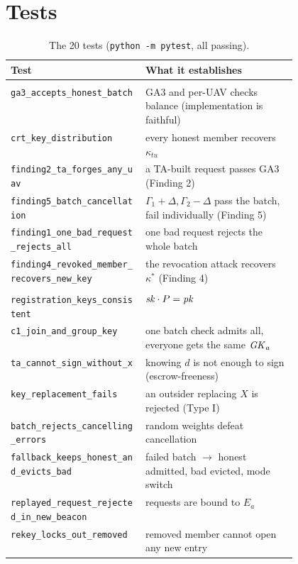 \section{Tests}
\begin{table}[H]
\centering\small
\caption{The 20 tests (\texttt{python -m pytest}, all passing).}
\label{tab:tests}
\begin{tabularx}{\linewidth}{@{}>{\raggedright\arraybackslash}p{0.47\linewidth}>{\raggedright\arraybackslash}X@{}}
\toprule
Test & What it establishes\\
\midrule
\multicolumn{2}{@{}l}{\emph{Base scheme}}\\
\texttt{ga3\_accepts\_honest\_batch} & GA3 and per-UAV checks balance (implementation is faithful)\\
\texttt{crt\_key\_distribution} & every honest member recovers $\kappa_{tu}$\\
\texttt{finding2\_ta\_forges\_any\_uav} & a TA-built request passes GA3 (Finding 2)\\
\texttt{finding5\_batch\_cancellation} & $\Gamma_1+\Delta,\Gamma_2-\Delta$ pass the batch, fail individually (Finding 5)\\
\texttt{finding1\_one\_bad\_request\_rejects\_all} & one bad request rejects the whole batch\\
\texttt{finding4\_revoked\_member\_recovers\_new\_key} & the revocation attack recovers $\kappa^*$ (Finding 4)\\
\midrule
\multicolumn{2}{@{}l}{\emph{Our framework}}\\
\texttt{registration\_keys\_consistent} & $\mathit{sk}\cdot P=\mathit{pk}$\\
\texttt{c1\_join\_and\_group\_key} & one batch check admits all, everyone gets the same $\mathit{GK}_a$\\
\texttt{ta\_cannot\_sign\_without\_x} & knowing $d$ is not enough to sign (escrow-freeness)\\
\texttt{key\_replacement\_fails} & an outsider replacing $X$ is rejected (Type I)\\
\texttt{batch\_rejects\_cancelling\_errors} & random weights defeat cancellation\\
\texttt{fallback\_keeps\_honest\_and\_evicts\_bad} & failed batch $\rightarrow$ honest admitted, bad evicted, mode switch\\
\texttt{replayed\_request\_rejected\_in\_new\_beacon} & requests are bound to $E_a$\\
\texttt{rekey\_locks\_out\_removed} & removed member cannot open any new entry\\

\end{tabularx}
\end{table}
